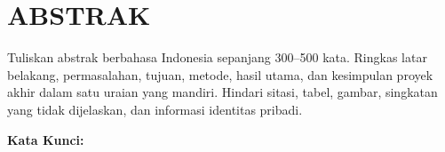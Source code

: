 \cleardoublepage
\chapter*{ABSTRAK}
\thispagestyle{fancy}

Tuliskan abstrak berbahasa Indonesia sepanjang 300--500 kata. Ringkas latar belakang,
permasalahan, tujuan, metode, hasil utama, dan kesimpulan proyek akhir dalam satu uraian
yang mandiri. Hindari sitasi, tabel, gambar, singkatan yang tidak dijelaskan, dan informasi
identitas pribadi.

\vspace{1cm}
\noindent\textbf{Kata Kunci:} \KataKunci
